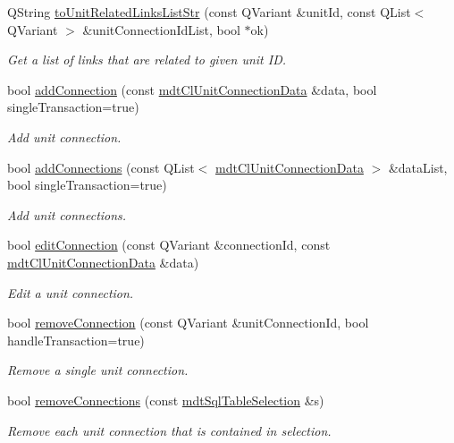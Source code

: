 \begin{DoxyCompactItemize}
Q\-String \hyperlink{classmdt_cl_unit_af87a65741ba7a6aa9f47a996005a9c3a}{to\-Unit\-Related\-Links\-List\-Str} (const Q\-Variant \&unit\-Id, const Q\-List$<$ Q\-Variant $>$ \&unit\-Connection\-Id\-List, bool $\ast$ok)
\begin{DoxyCompactList}\small\item\em Get a list of links that are related to given unit I\-D. \end{DoxyCompactList}\item 
bool \hyperlink{classmdt_cl_unit_a42b6918f809126d4ca1002c343f90316}{add\-Connection} (const \hyperlink{classmdt_cl_unit_connection_data}{mdt\-Cl\-Unit\-Connection\-Data} \&data, bool single\-Transaction=true)
\begin{DoxyCompactList}\small\item\em Add unit connection. \end{DoxyCompactList}\item 
bool \hyperlink{classmdt_cl_unit_a23c85173bd518a70e8fbae27f3e121ad}{add\-Connections} (const Q\-List$<$ \hyperlink{classmdt_cl_unit_connection_data}{mdt\-Cl\-Unit\-Connection\-Data} $>$ \&data\-List, bool single\-Transaction=true)
\begin{DoxyCompactList}\small\item\em Add unit connections. \end{DoxyCompactList}\item 
bool \hyperlink{classmdt_cl_unit_aac3afb2a4895a16f637b765b44cbca9e}{edit\-Connection} (const Q\-Variant \&connection\-Id, const \hyperlink{classmdt_cl_unit_connection_data}{mdt\-Cl\-Unit\-Connection\-Data} \&data)
\begin{DoxyCompactList}\small\item\em Edit a unit connection. \end{DoxyCompactList}\item 
bool \hyperlink{classmdt_cl_unit_aa4b4f148293abc335704515251ed4f5b}{remove\-Connection} (const Q\-Variant \&unit\-Connection\-Id, bool handle\-Transaction=true)
\begin{DoxyCompactList}\small\item\em Remove a single unit connection. \end{DoxyCompactList}\item 
bool \hyperlink{classmdt_cl_unit_a003f76bd0eaac138d3d2c3e9bf25ef08}{remove\-Connections} (const \hyperlink{classmdt_sql_table_selection}{mdt\-Sql\-Table\-Selection} \&s)
\begin{DoxyCompactList}\small\item\em Remove each unit connection that is contained in selection. \end{DoxyCompactList}\item 

\end{DoxyCompactItemize}
